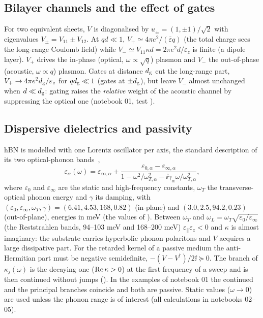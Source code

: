 \subsection{Bilayer channels and the effect of gates}
\label{sec:channelsV}

For two equivalent sheets, $V$ is diagonalised by $u_\pm=(1,\pm1)/\sqrt2$ with eigenvalues
$V_\pm=V_{11}\pm V_{12}$. At $qd\ll1$, $V_+\simeq 4\pi e^2/(\bar\varepsilon q)$ (the total charge sees the
long-range Coulomb field) while $V_-\simeq V_{11}\kappa d=2\pi e^2 d/\varepsilon_z$ is finite (a dipole layer).
$V_+$ drives the in-phase (optical, $\omega\propto\sqrt q$) plasmon and $V_-$ the out-of-phase (acoustic,
$\omega\propto q$) plasmon. Gates at distance $d_{\rm g}$ cut the long-range part,
$V_+\to 4\pi e^2 d_{\rm g}/\varepsilon_z$ for $qd_{\rm g}\ll1$ (gates at $\pm d_{\rm g}$), but leave $V_-$ almost unchanged when
$d\ll d_{\rm g}$: gating raises the \emph{relative} weight of the acoustic channel by suppressing the optical one
(notebook 01, test ).

\subsection{Dispersive dielectrics and passivity}

hBN is modelled with one Lorentz oscillator per axis, the standard description of its two optical-phonon
bands~\cite{Geick1966,Caldwell2014},
\begin{equation}
\varepsilon_\alpha(\omega)=\varepsilon_{\infty,\alpha}+\frac{\varepsilon_{0,\alpha}-\varepsilon_{\infty,\alpha}}{1-\omega^2/\omega_{T,\alpha}^2-\ii\gamma_\alpha\omega/\omega_{T,\alpha}^2},
\end{equation}
where $\varepsilon_{0}$ and $\varepsilon_\infty$ are the static and high-frequency constants, $\omega_T$ the transverse-optical
phonon energy and $\gamma$ its damping, with $(\varepsilon_0,\varepsilon_\infty,\omega_T,\gamma)=(6.41,4.53,168,0.82)$ (in-plane) and
$(3.0,2.5,94.2,0.23)$ (out-of-plane), energies in meV (the values of ). Between $\omega_T$ and
$\omega_L=\omega_T\sqrt{\varepsilon_0/\varepsilon_\infty}$ (the Reststrahlen bands, 94--103 meV and
168--200 meV) $\varepsilon_\parallel\varepsilon_z<0$ and $\kappa$ is almost imaginary: the substrate carries
hyperbolic phonon polaritons and $V$ acquires a large dissipative part. For the retarded kernel of a passive
medium the anti-Hermitian part must be negative semidefinite, $-(V-V^\dagger)/2\ii\succeq0$. The branch of
$\kappa_j(\omega)$ is the decaying one ($\operatorname{Re}\kappa>0$) at the first frequency of a sweep and is then
continued without jumps (). In the examples of notebook 01 the continued
and the principal branches coincide and both are passive. Static values ($\omega\to0$) are used unless the
phonon range is of interest (all calculations in notebooks 02--05).
